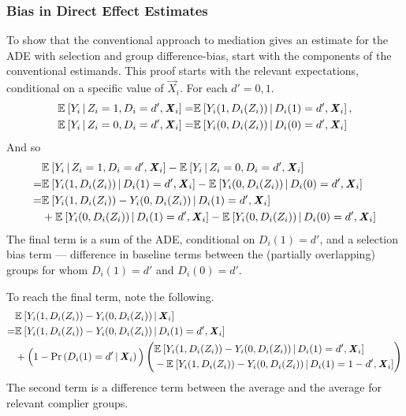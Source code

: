 \subsubsection{Bias in Direct Effect Estimates}
To show that the conventional approach to mediation gives an estimate for the ADE with selection and group difference-bias, start with the components of the conventional estimands.
This proof starts with the relevant expectations, conditional on a specific value of $\vec X_i$.
For each $d' =0, 1$.
\begin{align*}
    \mathbb{E}_{} \left[ Y_i \, \middle\vert \, Z_i = 1, D_i = d', \boldsymbol{\mathit{X}}_i \right]
    =& \mathbb{E}_{} \left[ Y_i(1, D_i(Z_i)) \, \middle\vert \, D_i(1) = d', \boldsymbol{\mathit{X}}_i \right], \\
    \mathbb{E}_{} \left[ Y_i \, \middle\vert \, Z_i = 0, D_i = d', \boldsymbol{\mathit{X}}_i \right]
    =& \mathbb{E}_{} \left[ Y_i(0, D_i(Z_i)) \, \middle\vert \, D_i(0) = d', \boldsymbol{\mathit{X}}_i \right]
\end{align*}
And so
\begin{align*}
    &  \mathbb{E}_{} \left[ Y_i \, \middle\vert \, Z_i = 1, D_i = d', \boldsymbol{\mathit{X}}_i \right]
    - \mathbb{E}_{} \left[ Y_i \, \middle\vert \, Z_i = 0, D_i = d', \boldsymbol{\mathit{X}}_i \right] \\
    =& \mathbb{E}_{} \left[ Y_i(1, D_i(Z_i)) \, \middle\vert \, D_i(1) = d', \boldsymbol{\mathit{X}}_i \right]
    - \mathbb{E}_{} \left[ Y_i(0, D_i(Z_i)) \, \middle\vert \, D_i(0) = d', \boldsymbol{\mathit{X}}_i \right] \\
    =& \mathbb{E}_{} \left[ Y_i(1, D_i(Z_i)) - Y_i(0, D_i(Z_i)) \, \middle\vert \, D_i(1) = d', \boldsymbol{\mathit{X}}_i \right] \\
    &+ \mathbb{E}_{} \left[ Y_i(0, D_i(Z_i)) \, \middle\vert \, D_i(1) = d', \boldsymbol{\mathit{X}}_i \right]
        - \mathbb{E}_{} \left[ Y_i(0, D_i(Z_i)) \, \middle\vert \, D_i(0) = d', \boldsymbol{\mathit{X}}_i \right] 
\end{align*}
The final term is a sum of the ADE, conditional on $D_i(1) = d'$, and a selection bias term --- difference in baseline terms between the (partially overlapping) groups for whom $D_i(1) = d'$ and $D_i(0) = d'$.

To reach the final term, note the following.
\begin{align*}
    &\mathbb{E}_{} \left[ Y_i(1, D_i(Z_i)) - Y_i(0, D_i(Z_i)) \, \middle\vert \, \boldsymbol{\mathit{X}}_i \right] \\    
    =& \mathbb{E}_{} \left[ Y_i(1, D_i(Z_i)) - Y_i(0, D_i(Z_i)) \, \middle\vert \, D_i(1) = d', \boldsymbol{\mathit{X}}_i \right] \\
    &+ \Big(1 - \Pr\left( D_i(1) = d' \, \middle\vert \, \boldsymbol{\mathit{X}}_i \right)\Big)
    \left( \begin{aligned}
        &\mathbb{E}_{} \left[ Y_i(1, D_i(Z_i)) - Y_i(0, D_i(Z_i)) \, \middle\vert \, D_i(1) = d', \boldsymbol{\mathit{X}}_i \right] \\ 
        & - \mathbb{E}_{} \left[ Y_i(1, D_i(Z_i)) - Y_i(0, D_i(Z_i)) \, \middle\vert \, D_i(1) = 1 - d', \boldsymbol{\mathit{X}}_i \right]
    \end{aligned} \right) 
\end{align*}
The second term is a difference term between the average and the average for relevant complier groups.

